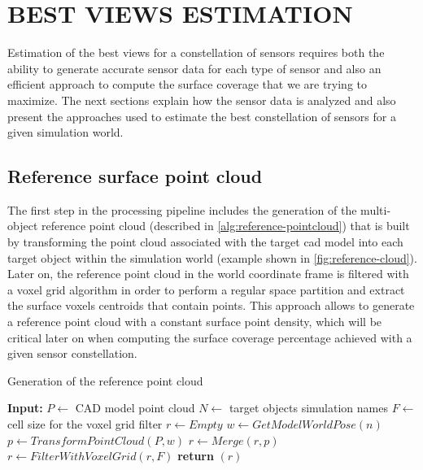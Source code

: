 \section{\uppercase{Best views estimation}}\label{sec:best-views-estimation}

\noindent Estimation of the best views for a constellation of sensors requires both the ability to generate accurate sensor data for each type of sensor and also an efficient approach to compute the surface coverage that we are trying to maximize. The next sections explain how the sensor data is analyzed and also present the approaches used to estimate the best constellation of sensors for a given simulation world.

\subsection{Reference surface point cloud}

The first step in the processing pipeline includes the generation of the multi-object reference point cloud (described in \cref{alg:reference-pointcloud}) that is built by transforming the point cloud associated with the target \gls{cad} model into each target object within the simulation world (example shown in \cref{fig:reference-cloud}). Later on, the reference point cloud in the world coordinate frame is filtered with a voxel grid algorithm in order to perform a regular space partition and extract the surface voxels centroids that contain points. This approach allows to generate a reference point cloud with a constant surface point density, which will be critical later on when computing the surface coverage percentage achieved with a given sensor constellation.

\begin{algorithm}
	\caption{Generation of the reference point cloud}
	\label{alg:reference-pointcloud}
	\begin{algorithmic}[1]
		\State \textbf{Input:}
		\State $P \gets$ CAD model point cloud
		\State $N \gets$ target objects simulation names
		\State $F \gets$ cell size for the voxel grid filter
			\State $r \gets Empty$
				\State $w \gets GetModelWorldPose(n)$
				\State $p \gets TransformPointCloud(P,w)$
				\State $r \gets Merge(r,p)$
			\EndFor
			\State $r \gets FilterWithVoxelGrid(r,F)$
			\State \textbf{return} $(r)$
		\EndProcedure
	\end{algorithmic}
\end{algorithm}


